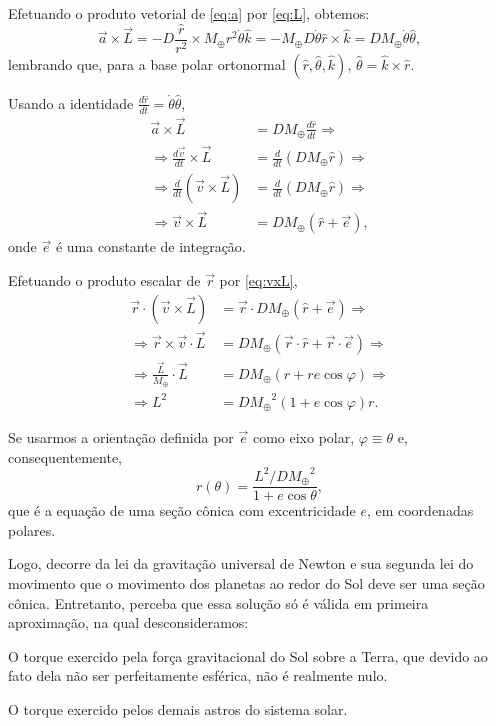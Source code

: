 \documentclass[a4paper, 12pt]{scrartcl}
\newcommand\earthmass{\ensuremath{M_{\oplus}}}
\begin{document}
	Efetuando o produto vetorial de \eqref{eq:a} por \eqref{eq:L}, obtemos:
	\begin{equation*}
		\vec a \times \vec L = - D \frac{\hat r}{r^2} \times \earthmass r^2 \dot\theta \hat k
		                     = - \earthmass D \dot\theta \hat{r}\times\hat{k}
		                     = D \earthmass \dot\theta \hat\theta,
	\end{equation*}
	lembrando que, para a base polar ortonormal $(\hat{r}, \hat{\theta}, \hat{k})$, $\hat\theta = \hat{k}\times\hat{r}$.

	Usando a identidade $\frac{d\hat{r}}{dt} = \dot\theta \hat\theta$,
	\begin{align}
		\vec a \times \vec L &= D \earthmass \frac{d\hat{r}}{dt} \Rightarrow \nonumber\\
		\Rightarrow \frac{d \vec v}{dt} \times \vec L &= \frac{d}{dt}\left(D\earthmass\hat{r}\right) \Rightarrow \nonumber\\
		\Rightarrow \frac{d}{dt}\left(\vec v \times \vec L\right) &= \frac{d}{dt}\left(D\earthmass\hat{r}\right) \Rightarrow \nonumber\\
		\Rightarrow \vec{v} \times \vec{L} &= D\earthmass \left(\hat r + \vec e\right), \label{eq:vxL}
	\end{align}
	onde $\vec e$ é uma constante de integração.

	Efetuando o produto escalar de $\vec{r}$ por \eqref{eq:vxL},
	\begin{align*}
		\vec{r} \cdot \left(\vec{v} \times \vec{L}\right) &= \vec{r} \cdot D\earthmass \left(\hat{r} + \vec{e}\right) \Rightarrow\\
		\Rightarrow \vec{r} \times \vec{v} \cdot \vec{L} &= D\earthmass \left(\vec{r} \cdot \hat{r} + \vec{r} \cdot \vec{e}\right) \Rightarrow\\
		\Rightarrow \frac{\vec{L}}{\earthmass} \cdot \vec{L} &= D\earthmass \left(r + re\cos\varphi\right) \Rightarrow\\
		\Rightarrow L^2 &= D\earthmass^2\left(1 + e \cos\varphi\right) r.
	\end{align*}

	Se usarmos a orientação definida por $\vec e$ como eixo polar, $\varphi \equiv \theta$ e, consequentemente,
	\begin{equation*}
		r(\theta) = \frac{L^2/D\earthmass^2}{1 + e \cos\theta},
	\end{equation*}
	que é a equação de uma seção cônica com excentricidade $e$, em coordenadas polares.

	Logo, decorre da lei da gravitação universal de Newton e sua segunda lei do movimento que o movimento dos planetas ao redor do Sol deve ser uma seção cônica.
	Entretanto, perceba que essa solução só é válida em primeira aproximação, na qual desconsideramos:
	\begin{compactitem}
		\item O torque exercido pela força gravitacional do Sol sobre a Terra, que devido ao fato dela não ser perfeitamente esférica, não é realmente nulo.
		\item O torque exercido pelos demais astros do sistema solar.
	\end{compactitem}
\end{document}
